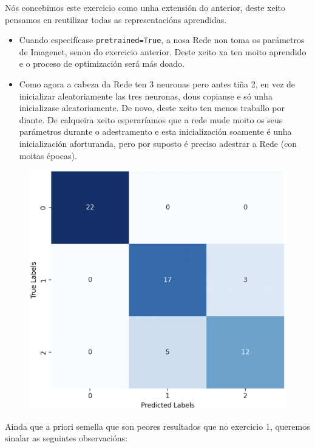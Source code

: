 \documentclass{article}
\begin{document}
Nós concebimos este exercicio como unha extensión do anterior, deste xeito pensamos en reutilizar todas as representacións aprendidas.
\begin{itemize}
	\item Cuando especifícase \texttt{pretrained=True}, a nosa Rede non toma os parámetros de Imagenet, senon do exercicio anterior. Deste xeito xa ten moito aprendido e o proceso de optimización será más doado.
	\item Como agora a cabeza da Rede ten 3 neuronas pero antes tiña 2, en vez de inicializar aleatoriamente las tres neuronas, dous copianse e só unha inicializase aleatoriamente. De novo, deste xeito ten menos traballo por diante. De calqueira xeito esperaríamos que a rede mude moito os seus parámetros durante o adestramento e esta inicialización soamente é unha inicialización aforturanda, pero por suposto é preciso adestrar a Rede (con moitas épocas).

\end{itemize}


\begin{figure}
	\includegraphics[width=1\linewidth]{cmEj2} 
	\label{fig:cmEj2}
\end{figure}

Ainda que a priori semella que son peores resultados que no exercicio 1, queremos sinalar as seguintes observacións:
\end{document}
